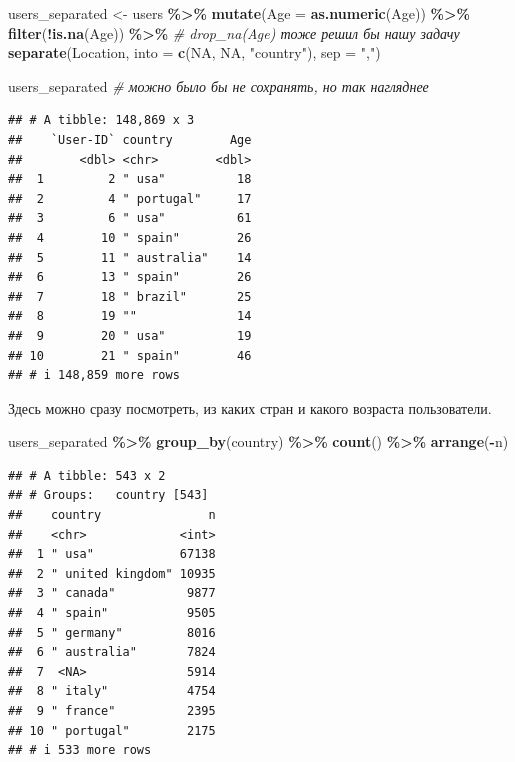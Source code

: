 \documentclass[
]{book}
\newenvironment{Shaded}{\begin{snugshade}}{\end{snugshade}}
\newcommand{\AttributeTok}[1]{\textcolor[rgb]{0.13,0.29,0.53}{#1}}
\newcommand{\CommentTok}[1]{\textcolor[rgb]{0.56,0.35,0.01}{\textit{#1}}}
\newcommand{\ConstantTok}[1]{\textcolor[rgb]{0.56,0.35,0.01}{#1}}
\newcommand{\FunctionTok}[1]{\textcolor[rgb]{0.13,0.29,0.53}{\textbf{#1}}}
\newcommand{\NormalTok}[1]{#1}
\newcommand{\OtherTok}[1]{\textcolor[rgb]{0.56,0.35,0.01}{#1}}
\newcommand{\SpecialCharTok}[1]{\textcolor[rgb]{0.81,0.36,0.00}{\textbf{#1}}}
\newcommand{\StringTok}[1]{\textcolor[rgb]{0.31,0.60,0.02}{#1}}
\theoremstyle{definition}
\theoremstyle{definition}
\theoremstyle{definition}
\theoremstyle{definition}
\theoremstyle{remark}
\begin{document}
\begin{Shaded}
\begin{Highlighting}[]
\NormalTok{users\_separated }\OtherTok{\textless{}{-}}\NormalTok{ users }\SpecialCharTok{\%\textgreater{}\%} 
  \FunctionTok{mutate}\NormalTok{(}\AttributeTok{Age =} \FunctionTok{as.numeric}\NormalTok{(Age)) }\SpecialCharTok{\%\textgreater{}\%}
  \FunctionTok{filter}\NormalTok{(}\SpecialCharTok{!}\FunctionTok{is.na}\NormalTok{(Age))  }\SpecialCharTok{\%\textgreater{}\%} \CommentTok{\# drop\_na(Age) тоже решил бы нашу задачу}
  \FunctionTok{separate}\NormalTok{(Location, }\AttributeTok{into =} \FunctionTok{c}\NormalTok{(}\ConstantTok{NA}\NormalTok{, }\ConstantTok{NA}\NormalTok{, }\StringTok{"country"}\NormalTok{), }\AttributeTok{sep =} \StringTok{","}\NormalTok{)}

\NormalTok{users\_separated }\CommentTok{\# можно было бы не сохранять, но так нагляднее}
\end{Highlighting}
\end{Shaded}

\begin{verbatim}
## # A tibble: 148,869 x 3
##    `User-ID` country        Age
##        <dbl> <chr>        <dbl>
##  1         2 " usa"          18
##  2         4 " portugal"     17
##  3         6 " usa"          61
##  4        10 " spain"        26
##  5        11 " australia"    14
##  6        13 " spain"        26
##  7        18 " brazil"       25
##  8        19 ""              14
##  9        20 " usa"          19
## 10        21 " spain"        46
## # i 148,859 more rows
\end{verbatim}

Здесь можно сразу посмотреть, из каких стран и какого возраста пользователи.

\begin{Shaded}
\begin{Highlighting}[]
\NormalTok{users\_separated }\SpecialCharTok{\%\textgreater{}\%} 
  \FunctionTok{group\_by}\NormalTok{(country) }\SpecialCharTok{\%\textgreater{}\%}
  \FunctionTok{count}\NormalTok{() }\SpecialCharTok{\%\textgreater{}\%} 
  \FunctionTok{arrange}\NormalTok{(}\SpecialCharTok{{-}}\NormalTok{n)}
\end{Highlighting}
\end{Shaded}

\begin{verbatim}
## # A tibble: 543 x 2
## # Groups:   country [543]
##    country               n
##    <chr>             <int>
##  1 " usa"            67138
##  2 " united kingdom" 10935
##  3 " canada"          9877
##  4 " spain"           9505
##  5 " germany"         8016
##  6 " australia"       7824
##  7  <NA>              5914
##  8 " italy"           4754
##  9 " france"          2395
## 10 " portugal"        2175
## # i 533 more rows
\end{verbatim}
\end{document}
